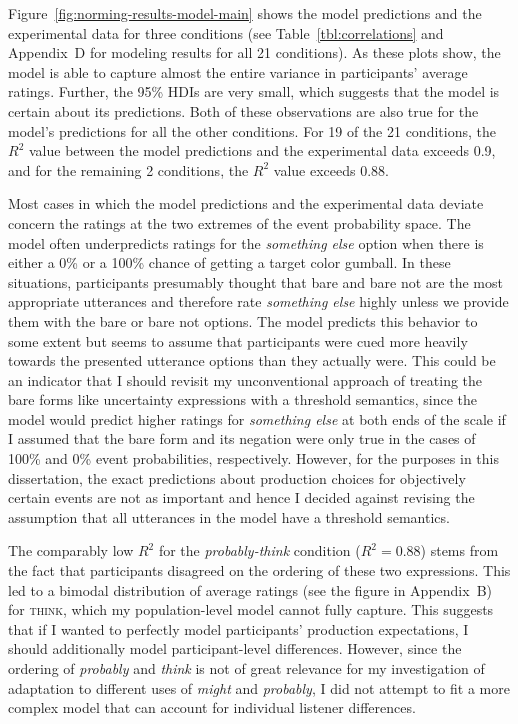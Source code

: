 Figure~\ref{fig:norming-results-model-main} shows the model predictions and the experimental data for three conditions 
(see Table~\ref{tbl:correlations} and Appendix~D for modeling results for all 21 conditions). As these plots show, the model
is able to capture almost the entire variance in participants' average ratings. Further, the 95\% HDIs are very small, which suggests
that the model is certain about its predictions. Both of these observations are also true for the model's predictions for all the other
conditions. For 19 of the 21 conditions, the $R^2$ value between the model predictions and the experimental data exceeds 0.9,
and for the remaining 2 conditions, the $R^2$ value exceeds 0.88. 

Most cases in which the model predictions and the experimental data deviate concern the ratings at the two extremes of the event probability space.
The model often underpredicts ratings for the \textit{something else} option when there is either a 0\% or a 100\% chance of 
getting a target color gumball. In these situations, participants presumably thought that {\sc bare} and {\sc bare not} are the most appropriate
utterances and therefore rate \textit{something else} highly unless we provide them with the {\sc bare} or {\sc bare not} options. The model predicts
this behavior to some extent but seems to assume that participants were cued more heavily towards the presented utterance options than they actually were.
This could be an indicator that I should revisit my unconventional approach of treating the bare forms like uncertainty expressions with a threshold semantics,
since the model would predict higher ratings for \textit{something else} at both ends of the scale if I assumed that the bare form and its negation were only true
in the cases of 100\% and 0\% event probabilities, respectively. 
However, for the purposes in this dissertation, the exact predictions about production choices for objectively certain events are not as important and hence
I decided against revising the assumption that all utterances in the model have a threshold semantics.

The comparably low $R^2$ for the \textit{probably-think} condition ($R^2=0.88$) stems
from the fact that participants disagreed on the ordering of these two expressions. This  
led to a bimodal distribution of average ratings (see the figure in Appendix~B) for \textsc{think}, which my population-level 
model cannot fully capture. This suggests that if I wanted to perfectly model participants' production expectations, I should
additionally model participant-level differences. However, since the ordering of \textit{probably} and \textit{think} is not of great relevance
for my investigation of adaptation to different uses of \textit{might} and \textit{probably}, I did not attempt to fit a more complex model
that can account for individual listener differences. 

